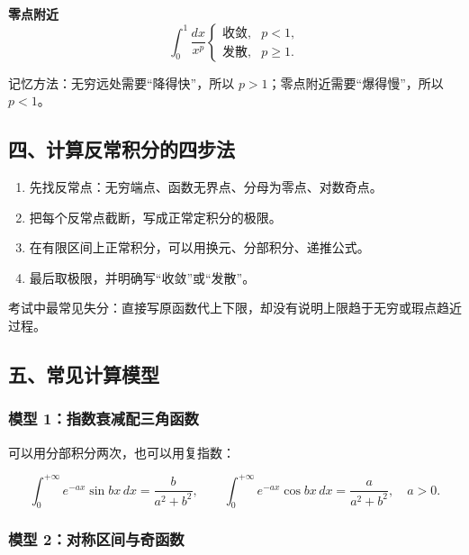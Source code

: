 \begin{conceptbox}
\textbf{零点附近}
\[
          \int_0^1\frac{dx}{x^p}
          \begin{cases}
          \text{收敛},&p<1,\\
          \text{发散},&p\ge1.
          \end{cases}
        \]
\end{conceptbox}

记忆方法：无穷远处需要“降得快”，所以 \(p>1\)；零点附近需要“爆得慢”，所以 \(p<1\)。

\subsection*{四、计算反常积分的四步法}

\begin{enumerate}
 \item 先找反常点：无穷端点、函数无界点、分母为零点、对数奇点。
 \item 把每个反常点截断，写成正常定积分的极限。
 \item 在有限区间上正常积分，可以用换元、分部积分、递推公式。
 \item 最后取极限，并明确写“收敛”或“发散”。
 \end{enumerate}

\begin{notebox}
考试中最常见失分：直接写原函数代上下限，却没有说明上限趋于无穷或瑕点趋近过程。
\end{notebox}

\subsection*{五、常见计算模型}

\subsubsection*{模型 1：指数衰减配三角函数}

可以用分部积分两次，也可以用复指数：

\[
      \int_0^{+\infty}e^{-ax}\sin bx\,dx
      =
      \frac{b}{a^2+b^2},
      \qquad
      \int_0^{+\infty}e^{-ax}\cos bx\,dx
      =
      \frac{a}{a^2+b^2},
      \quad a>0.
    \]

\subsubsection*{模型 2：对称区间与奇函数}

